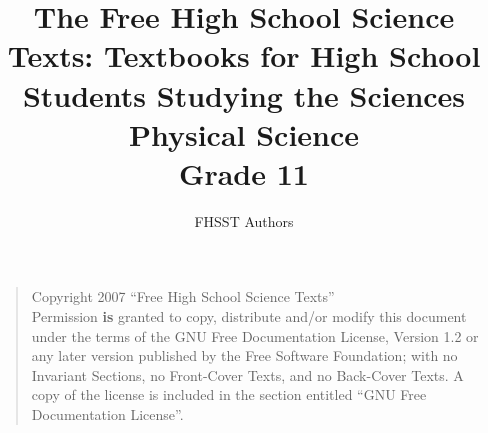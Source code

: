 \documentclass[9pt,a4paper,titlepage,twoside,openany]{extbook}
\begin{document}
\title{The Free High School Science Texts: Textbooks for High School Students Studying the Sciences\\
\textbf{Physical Science}\\
Grade 11}
\author{FHSST Authors}
\maketitle
\begin{quote}
Copyright 2007 ``Free High School Science Texts''\\
Permission \textbf{is} granted to copy, distribute and/or modify this document under the terms of the GNU Free Documentation License, Version 1.2 or any later version published by the Free Software Foundation; with no Invariant Sections, no Front-Cover Texts, and no Back-Cover Texts.
A copy of the license is included in the section entitled ``GNU Free Documentation License''.
\end{quote}
\end{document}
